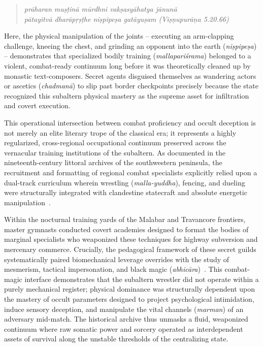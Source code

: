 \documentclass[11pt,twoside,letterpaper]{article}
\begin{document}
\begin{quote}
\noindent\textit{prāharan muṣṭinā mūrdhni vakṣasyāhatya jānunā \\}
\noindent\textit{pātayitvā dharāpṛṣṭhe niṣpipeṣa gatāyuṣam (Viṣṇupurāṇa 5.20.66)}
\end{quote}

Here, the physical manipulation of the joints – executing an arm-clapping challenge, kneeing the chest, and grinding an opponent into the earth (\textit{niṣpipeṣa}) – demonstrates that specialized bodily training (\textit{mallapariśrama}) belonged to a violent, combat-ready continuum long before it was theoretically cleaned up by monastic text-composers. Secret agents disguised themselves as wandering actors or ascetics (\textit{chadmanā}) to slip past border checkpoints precisely because the state recognized this subaltern physical mastery as the supreme asset for infiltration and covert execution.

This operational intersection between combat proficiency and occult deception is not merely an elite literary trope of the classical era; it represents a highly regularized, cross-regional occupational continuum preserved across the vernacular training institutions of the subaltern. As documented in the nineteenth-century littoral archives of the southwestern peninsula, the recruitment and formatting of regional combat specialists explicitly relied upon a dual-track curriculum wherein wrestling (\textit{malla-yuddha}), fencing, and dueling were structurally integrated with clandestine statecraft and absolute energetic manipulation~\cite{vilanilam1971}. 

Within the nocturnal training yards of the Malabar and Travancore frontiers, master gymnasts conducted covert academies designed to format the bodies of marginal specialists who weaponized these techniques for highway subversion and mercenary commerce. Crucially, the pedagogical framework of these secret guilds systematically paired biomechanical leverage overrides with the study of mesmerism, tactical impersonation, and black magic (\textit{abhicāra})~\cite{vilanilam1971}. This combat-magic interface demonstrates that the subaltern wrestler did not operate within a purely mechanical register; physical dominance was structurally dependent upon the mastery of occult parameters designed to project psychological intimidation, induce sensory deception, and manipulate the vital channels (\textit{marman}) of an adversary mid-match. The historical archive thus unmasks a fluid, weaponized continuum where raw somatic power and sorcery operated as interdependent assets of survival along the unstable thresholds of the centralizing state.
\end{document}
